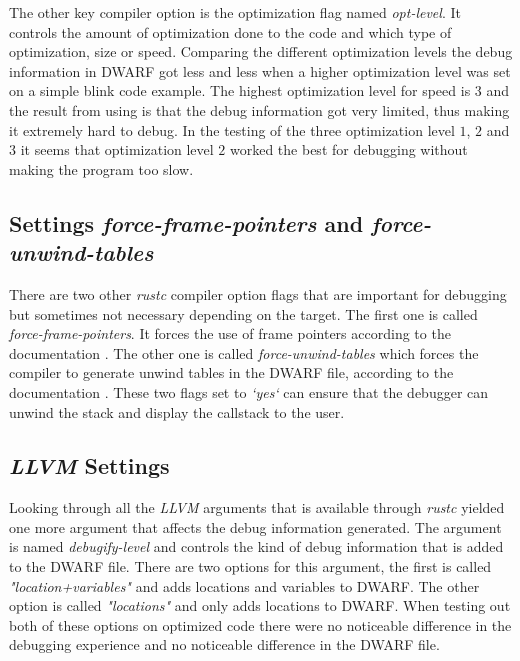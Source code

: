 The other key compiler option is the optimization flag named \emph{opt-level}.
It controls the amount of optimization done to the code and which type of optimization, size or speed.
Comparing the different optimization levels the debug information in \gls{DWARF} got less and less when a higher optimization level was set on a simple blink code example.
The highest optimization level for speed is $3$ and the result from using is that the debug information got very limited, thus making it extremely hard to debug.
In the testing of the three optimization level $1$, $2$ and $3$ it seems that optimization level $2$ worked the best for debugging without making the program too slow.


\subsection{Settings \emph{force-frame-pointers} and \emph{force-unwind-tables}}
There are two other \emph{rustc} compiler option flags that are important for debugging but sometimes not necessary depending on the target.
The first one is called \emph{force-frame-pointers}. 
It forces the use of frame pointers according to the documentation \cite{rustc-book-codegen}.
The other one is called \emph{force-unwind-tables} which forces the compiler to generate unwind tables in the \gls{DWARF} file, according to the documentation \cite{rustc-book-codegen}.
These two flags set to \emph{`yes`} can ensure that the debugger can unwind the stack and display the callstack to the user.


\subsection{\emph{LLVM} Settings}
Looking through all the \emph{LLVM} arguments that is available through \emph{rustc} yielded one more argument that affects the debug information generated.
The argument is named \emph{debugify-level} and controls the kind of debug information that is added to the \gls{DWARF} file.
There are two options for this argument, the first is called \emph{"location+variables"} and adds locations and variables to \gls{DWARF}.
The other option is called \emph{"locations"} and only adds locations to \gls{DWARF}.
When testing out both of these options on optimized code there were no noticeable difference in the debugging experience and no noticeable difference in the  \gls{DWARF} file.



